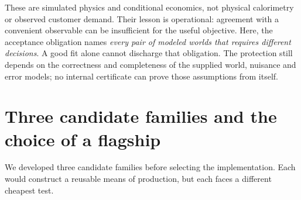 \documentclass[11pt,letterpaper]{article}
\theoremstyle{definition}\newtheorem{definition}[theorem]{Definition}
\theoremstyle{remark}\newtheorem{remark}[theorem]{Remark}
\begin{document}
These are simulated physics and conditional economics, not physical calorimetry or observed customer demand. Their lesson is operational: agreement with a convenient observable can be insufficient for the useful objective. Here, the acceptance obligation names \emph{every pair of modeled worlds that requires different decisions}. A good fit alone cannot discharge that obligation. The protection still depends on the correctness and completeness of the supplied world, nuisance and error models; no internal certificate can prove those assumptions from itself.

\section{Three candidate families and the choice of a flagship}
We developed three candidate families before selecting the implementation. Each would construct a reusable means of production, but each faces a different cheapest test.
\end{document}
